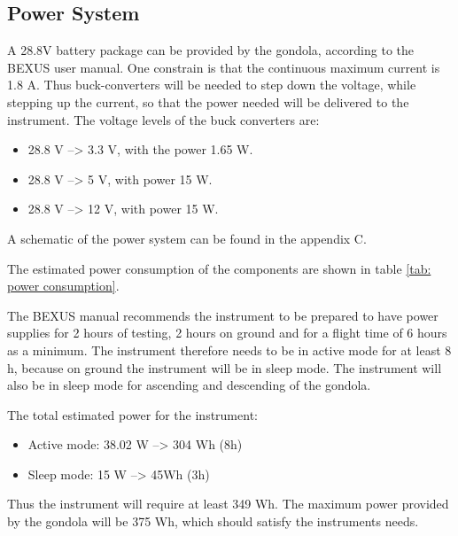 \pagebreak
\subsection{Power System}

\label{sec:4.7}

A 28.8V battery package can be provided by the gondola, according to the BEXUS user manual. One constrain is that the continuous maximum current is 1.8 A. Thus buck-converters will be needed to step down the voltage, while stepping up the current, so that the power needed will be delivered to the instrument. The voltage levels of the buck converters are: 

\begin{itemize}
	\item 28.8 V --> 3.3 V, with the power 1.65 W.
	\item 28.8 V --> 5 V, with power 15 W.
	\item 28.8 V --> 12 V, with power 15 W.
\end{itemize}

A schematic of the power system can be found in the appendix C.

The estimated power consumption of the components are shown in table \ref{tab: power consumption}. 



\newpage

The BEXUS manual recommends the instrument to be prepared to have power supplies for 2 hours of testing, 2 hours on ground and for a flight time of 6 hours as a minimum. The instrument therefore needs to be in active mode for at least 8 h, because on ground the instrument will be in sleep mode. The instrument will also be in sleep mode for ascending and descending of the gondola. 

The total estimated power for the instrument:

\begin{itemize}
    \item Active mode: 38.02 W  --> 304 Wh (8h)
    \item Sleep mode: 15 W --> 45Wh (3h) 
\end{itemize}

Thus the instrument will require at least 349 Wh. The maximum power provided by the gondola will be 375 Wh, which should satisfy the instruments needs.


\raggedbottom
